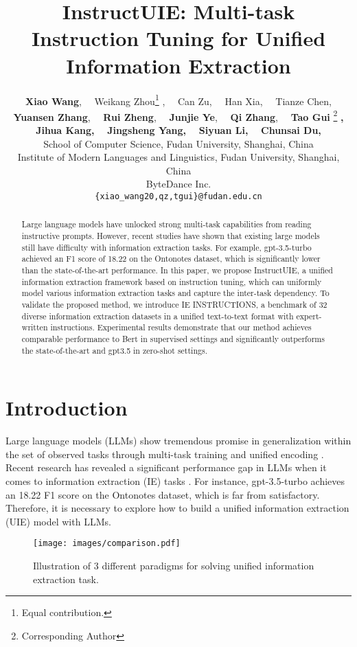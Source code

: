 \documentclass[11pt]{article}
\title{InstructUIE: Multi-task Instruction Tuning for Unified Information Extraction}
\author{
    {\normalsize
     \textbf{Xiao Wang}, 
     \ \ Weikang Zhou\thanks{  Equal contribution.} ,
     \ \ Can Zu, 
     \ \ Han Xia, 
     \ \ Tianze Chen,}\\
    {\normalsize
     \textbf{Yuansen Zhang}, 
    \ \ \textbf{Rui Zheng}, 
    \ \ \textbf{Junjie Ye}, 
    \ \ \textbf{Qi Zhang},
    \ \ \textbf{Tao Gui}
    \thanks{{} {} Corresponding Author} 
    \textbf{,}
    }\\
    {\normalsize
    \textbf{Jihua Kang}\textbf{,} 
    \ \ \textbf{Jingsheng Yang}\textbf{,} 
    \ \ \textbf{Siyuan Li}\textbf{,} 
    \ \ \textbf{Chunsai Du}\textbf{,}
    }\\
  { \normalsize School of Computer Science, Fudan University, Shanghai, China} \\
  { \normalsize Institute of Modern Languages and Linguistics, Fudan University, Shanghai, China} \\
  { \normalsize ByteDance Inc.} \\
  \texttt{\normalsize \{xiao\_wang20,qz,tgui\}@fudan.edu.cn}
}
\begin{document}
\maketitle
\begin{abstract}


Large language models have unlocked strong multi-task capabilities from reading instructive prompts.
However, recent studies have shown that existing large models still have difficulty with information extraction tasks. 
For example, gpt-3.5-turbo achieved an F1 score of 18.22 on the Ontonotes dataset, which is significantly lower than the state-of-the-art performance.
In this paper, we propose InstructUIE, a unified information extraction framework based on instruction tuning, which can uniformly model various information extraction tasks and capture the inter-task dependency.
To validate the proposed method, we introduce IE INSTRUCTIONS, a benchmark of 32 diverse information extraction datasets in a unified text-to-text format with expert-written instructions.
Experimental results demonstrate that our method achieves comparable performance to Bert in supervised settings and significantly outperforms the state-of-the-art and gpt3.5 in zero-shot settings.

\end{abstract}

\section{Introduction}

Large language models (LLMs) \cite{Brown2020LanguageMA,InstructGPT,GPT4} show tremendous promise in generalization within the set of observed tasks through multi-task training and unified encoding \cite{mishra-etal-2022-cross,wang-etal-2022-super,Longpre2023TheFC}. 
Recent research has revealed a significant performance gap in LLMs when it comes to information extraction (IE) tasks \cite{ye2023comprehensive,chen2023robust}. 
For instance, gpt-3.5-turbo achieves an 18.22 F1 score on the Ontonotes dataset, which is far from satisfactory. 
Therefore, it is necessary to explore how to build a unified information extraction (UIE) model with LLMs.

\begin{figure}[t]
\small
\centering
  \texttt{[image: images/comparison.pdf]}
  \caption{Illustration of 3 different paradigms for solving unified information extraction task.}
 \label{comparison}
\end{figure}
\end{document}
